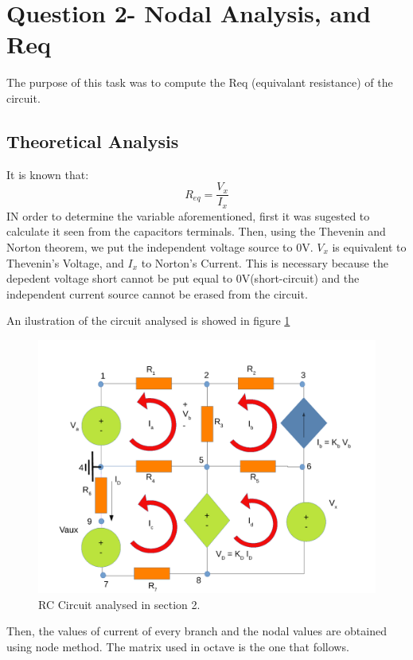 \section{Question 2- Nodal Analysis, and Req}
The purpose of this task was to compute the Req (equivalant resistance) of the circuit.

\subsection{Theoretical Analysis}
It is known that:
\begin{equation}
R_{eq}=\frac{V_{x}}{I_{x}}
\end{equation}
IN order to determine the variable aforementioned, first it was sugested to calculate it seen from the capacitors terminals. Then, using the Thevenin and Norton theorem, we put the independent voltage source to 0V. $V_{x}$ is equivalent to Thevenin's Voltage, and $I_{x}$ to Norton's Current. This is necessary because the depedent voltage short cannot be put equal to 0V(short-circuit) and the independent current source cannot be erased from the circuit.
\par An ilustration of the circuit analysed is showed in figure \ref{sim2draw} 
\begin{figure}[ht] \centering
\includegraphics[width=1.0\linewidth]{sim2draw.pdf}
\caption{RC Circuit analysed in section 2.}
\label{sim2draw}
\end{figure}
\par
Then, the values of current of  every branch and the nodal values are obtained using node method. The matrix used in octave is the one that follows.

